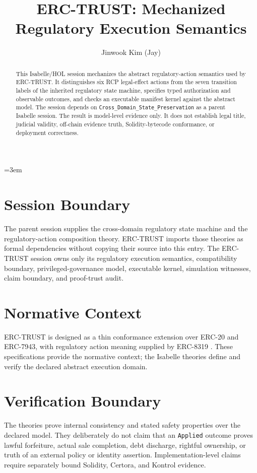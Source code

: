 \documentclass[11pt,a4paper]{article}
\begin{document}
\emergencystretch=3em

\title{ERC-TRUST: Mechanized Regulatory Execution Semantics}
\author{Jinwook Kim (Jay)}
\maketitle

\begin{abstract}
This Isabelle/HOL session mechanizes the abstract regulatory-action semantics
used by ERC-TRUST. It distinguishes six RCP legal-effect actions from the
seven transition labels of the inherited regulatory state machine, specifies
typed authorization and observable outcomes, and checks an executable
manifest kernel against the abstract model. The session depends on
\texttt{Cross\_Domain\_State\_Preservation} as a parent Isabelle session.
The result is model-level evidence only. It does not establish legal title,
judicial validity, off-chain evidence truth, Solidity-bytecode conformance,
or deployment correctness.
\end{abstract}

\tableofcontents

\section{Session Boundary}

The parent session supplies the cross-domain regulatory state machine and the
regulatory-action composition theory. ERC-TRUST imports those theories as
formal dependencies without copying their source into this entry. The
ERC-TRUST session owns only its regulatory execution semantics, compatibility
boundary, privileged-governance model, executable kernel, simulation
witnesses, claim boundary, and proof-trust audit.

\section{Normative Context}

ERC-TRUST is designed as a thin conformance extension over ERC-20 and
ERC-7943, with regulatory action meaning supplied by ERC-8319
\cite{ERC7943,ERC8319}. These specifications provide the normative context;
the Isabelle theories define and verify the declared abstract execution
domain.

\section{Verification Boundary}

The theories prove internal consistency and stated safety properties over the
declared model. They deliberately do not claim that an \texttt{Applied}
outcome proves lawful forfeiture, actual sale completion, debt discharge,
rightful ownership, or truth of an external policy or identity assertion.
Implementation-level claims require separately bound Solidity, Certora, and
Kontrol evidence.





\end{document}
